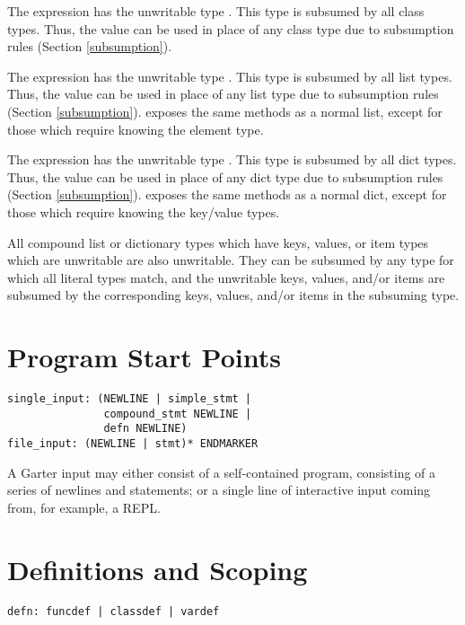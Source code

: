 The expression  has the unwritable type . This
type is subsumed by all class types. Thus, the  value can be used in
place of any class type due to subsumption rules (Section \ref{subsumption}).

The expression \code{[]} has the unwritable type .
This type is subsumed by all list types. Thus, the \code{[]} value can be used
in place of any list type due to subsumption rules (Section \ref{subsumption}).
 exposes the same methods as a normal list, except
for those which require knowing the element type.

The expression \code{\{\}} has the unwritable type .
This type is subsumed by all dict types. Thus, the \code{\{\}} value can be used
in place of any dict type due to subsumption rules (Section \ref{subsumption}).
 exposes the same methods as a normal dict, except
for those which require knowing the key/value types.

All compound list or dictionary types which have keys, values, or item types which
are unwritable are also unwritable. They can be subsumed by any type for which
all literal types match, and the unwritable keys, values, and/or items are subsumed
by the corresponding keys, values, and/or items in the subsuming type.

\section{Program Start Points}

\begin{lstlisting}
single_input: (NEWLINE | simple_stmt |
               compound_stmt NEWLINE |
               defn NEWLINE)
file_input: (NEWLINE | stmt)* ENDMARKER
\end{lstlisting}

A Garter input may either consist of a self-contained program, consisting of a
series of newlines and statements; or a single line of interactive
input coming from, for example, a REPL.

\section{Definitions and Scoping}
\label{sec:defs_and_scoping}

\begin{lstlisting}
defn: funcdef | classdef | vardef
\end{lstlisting}

